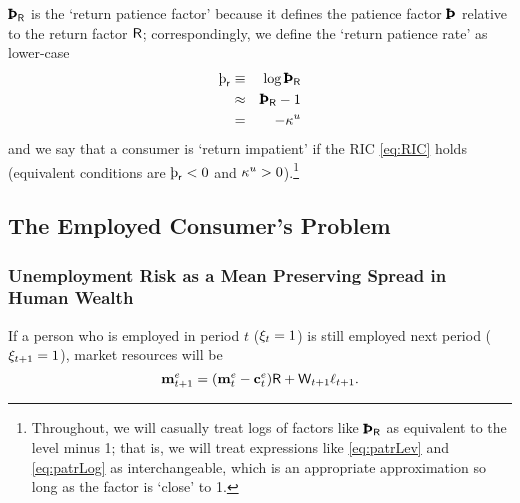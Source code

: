 \message{ !name(TractableBufferStock.tex)}\documentclass{handout}
\begin{document}
$\PatR$ is the `return patience factor' because it defines the patience factor $\Pat$
relative to the return factor $\mathsf{R}$; correspondingly, we define the `return
patience rate' as lower-case
\begin{eqnarray}
   \patr & \equiv &  \log \PatR \label{eq:patrLog}
\\ & \approx &\PatR - 1 \label{eq:patrLev}
\\ & = & -\MPCU
\end{eqnarray}
and we say that a consumer is `return impatient' if the RIC \eqref{eq:RIC} holds (equivalent conditions are $\patr < 0$ and $\kappa^{u} > 0$).\footnote{Throughout, we will casually treat logs of factors like $\PatR$ as equivalent to the level minus 1; that is, we will treat expressions like \eqref{eq:patrLev} and \eqref{eq:patrLog} as interchangeable, which is an appropriate approximation so long as the factor is `close' to 1.}

\subsection{The Employed Consumer's Problem}

\subsubsection{Unemployment Risk as a Mean Preserving Spread in Human Wealth} \label{subsubsec:uMPS}
If a person who is employed in period $t$ ($\xi_{t}=1$) is still employed next
period ($\xi_{t+1}=1$), market resources will be
\begin{equation}
\mathbf{m}^{e}_{t+1} = (\mathbf{m}^{e}_{t}-\mathbf{c}^{e}_{t})\mathsf{R}+\mathsf{W}_{t+1}\ell_{t+1}. \label{eq:Metp1}
\end{equation}
\end{document}

